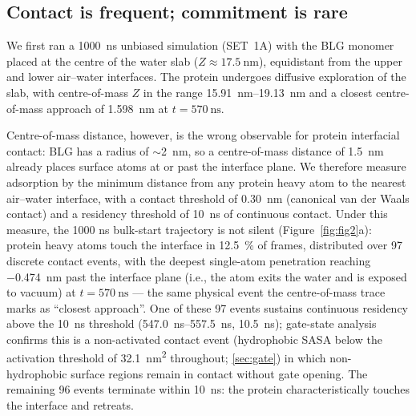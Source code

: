 \documentclass[11pt,a4paper]{article}
\begin{document}
\subsection{Contact is frequent; commitment is rare}
\label{sec:contact-residency}

We first ran a \SI{1000}{\nano\second} unbiased simulation (SET~1A) with
the BLG monomer placed at the centre of the water slab
($Z \approx \SI{17.5}{\nano\metre}$), equidistant from the upper and lower
air--water interfaces. The protein undergoes diffusive exploration of
the slab, with centre-of-mass $Z$ in the range
\SIrange{15.91}{19.13}{\nano\metre} and a closest centre-of-mass
approach of \SI{1.598}{\nano\metre} at $t = \SI{570}{\nano\second}$.

Centre-of-mass distance, however, is the wrong observable for protein
interfacial contact: BLG has a radius of $\sim$\SI{2}{\nano\metre}, so a
centre-of-mass distance of \SI{1.5}{\nano\metre} already places surface
atoms at or past the interface plane. We therefore measure adsorption by
the minimum distance from any protein heavy atom to the nearest
air--water interface, with a contact threshold of \SI{0.30}{\nano\metre}
(canonical van der Waals contact) and a residency threshold of
\SI{10}{\nano\second} of continuous contact. Under this measure, the
1000 \si{\nano\second} bulk-start trajectory is not silent
(Figure~\ref{fig:fig2}a): protein heavy atoms touch the interface in
\SI{12.5}{\percent} of frames, distributed over \num{97} discrete
contact events, with the deepest single-atom penetration reaching
\SI{-0.474}{\nano\metre} past the interface plane (i.e., the atom
exits the water and is exposed to vacuum) at $t = \SI{570}{\nano\second}$
--- the same physical event the centre-of-mass trace marks as ``closest
approach''. One of these \num{97} events sustains continuous residency above the
\SI{10}{\nano\second} threshold (\SIrange{547.0}{557.5}{\nano\second},
\SI{10.5}{\nano\second}); gate-state analysis confirms this is a
non-activated contact event (hydrophobic SASA below the activation
threshold of \SI{32.1}{\nano\metre\squared} throughout; \cref{sec:gate})
in which non-hydrophobic surface regions remain in contact without gate opening. The remaining \num{96} events terminate
within \SI{10}{\nano\second}: the protein characteristically touches
the interface and retreats.
\end{document}

